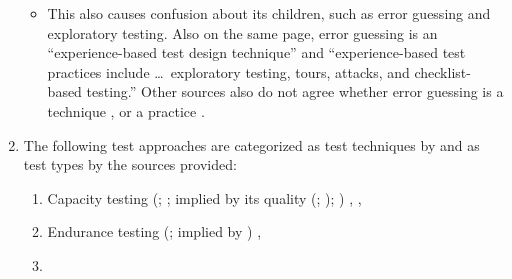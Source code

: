 \begin{enumerate}
\begin{itemize}
                  \item %
                        This also causes confusion about its children, such as
                        error guessing and exploratory testing. Also on the
                        same page, \citet[p.~34]{IEEE2022} 
                        error guessing is an ``experience-based test design
                        technique'' and ``experience-based test practices
                        include \dots\ exploratory testing, tours, attacks, and
                        checklist-based testing.'' Other sources also do not
                        agree whether error guessing is a technique
                        \ifnotpaper
                            \citetext{pp.~20,~22,~34; \citeyear[p.~viii]{IEEE2021}}
                        \else
                            \cite[pp.~20,~22,~34]{IEEE2022}, \cite[p.~viii]{IEEE2021}
                        \fi or a practice \citep[p.~5-14]{SWEBOK2024}.
              \end{itemize}
          \fi
    \item The following test approaches are categorized as test
          techniques by \citep[p.~38]{IEEE2021} and as test types by the
          sources provided:
          \begin{enumerate}
              \item %
                    Capacity testing
                    \ifnotpaper
                        (\citealp[p.~22]{IEEE2022};
                        \citeyear[p.~2]{IEEE2013}; implied by its quality
                        (\citealp{ISO_IEC2023a}; \citealp[Tab.~A.1]{IEEE2021});
                        \citealp[p.~53]{Firesmith2015})%
                    \else
                        \cite[p.~22]{IEEE2022}, \cite[p.~2]{IEEE2013}%
                    \fi,
              \item %
                    Endurance testing
                    \ifnotpaper
                        (\citealp[p.~2]{IEEE2013};
                        implied by \citealp[p.~55]{Firesmith2015})%
                    \else
                        \cite[p.~2]{IEEE2013}%
                    \fi,
              \item %

\end{enumerate}
\end{enumerate}
